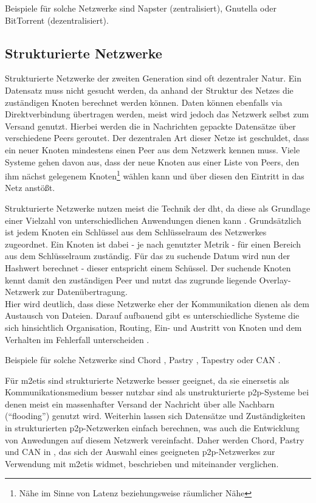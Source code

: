 Beispiele für solche Netzwerke sind Napster (zentralisiert), Gnutella oder BitTorrent (dezentralisiert).

\subsection{Strukturierte Netzwerke}
Strukturierte Netzwerke der zweiten Generation sind oft dezentraler Natur. Ein Datensatz muss nicht gesucht werden, da anhand der Struktur des Netzes die zuständigen Knoten berechnet werden können. Daten können ebenfalls via Direktverbindung übertragen werden, meist wird jedoch das Netzwerk selbst zum Versand genutzt. Hierbei werden die in Nachrichten gepackte Datensätze über verschiedene Peers geroutet. Der dezentralen Art dieser Netze ist geschuldet, dass ein neuer Knoten mindestens einen Peer aus dem Netzwerk kennen muss. Viele Systeme gehen davon aus, dass der neue Knoten aus einer Liste von Peers, den ihm nächst gelegenem Knoten\footnote{Nähe im Sinne von Latenz beziehungsweise räumlicher Nähe} wählen kann und über diesen den Eintritt in das Netz anstößt.

Strukturierte Netzwerke nutzen meist die Technik der \ac{dht}, da diese als Grundlage einer Vielzahl von unterschiedlichen Anwendungen dienen kann \cite{Wehrle2005, Ghodsi2006AlgorithmsDHT}. Grundsätzlich ist jedem Knoten ein Schlüssel aus dem Schlüsselraum des Netzwerkes zugeordnet. Ein Knoten ist dabei - je nach genutzter Metrik - für einen Bereich aus dem Schlüsselraum zuständig. Für das zu suchende Datum wird nun der Hashwert berechnet - dieser entspricht einem Schüssel. Der suchende Knoten kennt damit den zuständigen Peer und nutzt das zugrunde liegende Overlay-Netzwerk zur Datenübertragung.\\
Hier wird deutlich, dass diese Netzwerke eher der Kommunikation dienen als dem Austausch von Dateien. Darauf aufbauend gibt es unterschiedliche Systeme die sich hinsichtlich Organisation, Routing, Ein- und Austritt von Knoten und dem Verhalten im Fehlerfall unterscheiden \cite{Goetz2005, Lua2005Survey}.

Beispiele für solche Netzwerke sind Chord \cite{Hosseini2007Survey}, Pastry \cite{Rowstron2001}, Tapestry \cite{Zhao2001Tapestry,Zhao2004Tapestry} oder CAN \cite{Ratnasamy2001Scalable}. 

Für \ac{m2etis} sind strukturierte Netzwerke besser geeignet, da sie einersetis als Kommunikationsmedium besser nutzbar sind als unstrukturierte p2p-Systeme bei denen meist ein massenhafter Versand der Nachricht über alle Nachbarn (``flooding'') genutzt wird. Weiterhin lassen sich Datensätze und Zuständigkeiten in strukturierten p2p-Netzwerken einfach berechnen, was auch die Entwicklung von Anwedungen auf diesem Netzwerk vereinfacht. Daher werden Chord, Pastry und CAN in , das sich der Auswahl eines geeigneten p2p-Netzwerkes zur Verwendung mit \ac{m2etis} widmet, beschrieben und miteinander verglichen.
